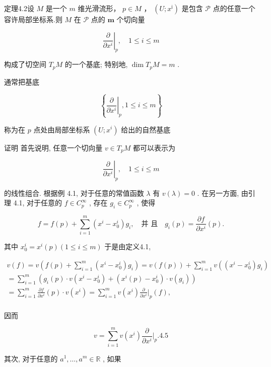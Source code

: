 定理4.2设  $M$  是一个  $m$  维光滑流形，  $p\in M$  ，  $(U;x^{\mathrm{i}})$  是包含  $\mathcal{P}$  点的任意一个容许局部坐标系.则  $M$  在  $\mathcal{P}$  点的  $\pmb{m}$  个切向量

$$
\left. \frac {\partial}{\partial x ^ {i}} \right| _ {p}, \quad 1 \leqslant i \leqslant m
$$

构成了切空间  $T_{p}M$  的一个基底; 特别地,  $\dim T_{p}M = m$ .

通常把基底

$$
\left\{\left. \frac {\partial}{\partial x ^ {i}} \right| _ {p}, 1 \leqslant i \leqslant m \right\}
$$

称为在  $p$  点处由局部坐标系  $(U; x^i)$  给出的自然基底

证明 首先说明, 任意一个切向量  $v \in T_pM$  都可以表示为

$$
\left. \frac {\partial}{\partial x ^ {i}} \right| _ {p}, \quad 1 \leqslant i \leqslant m
$$

的线性组合. 根据例 4.1, 对于任意的常值函数  $\lambda$  有  $v(\lambda) = 0$ . 在另一方面, 由引理 4.1, 对于任意的  $f \in C_{p}^{\infty}$ , 存在  $g_{i} \in C_{p}^{\infty}$ , 使得

$$
f = f (p) + \sum_ {i = 1} ^ {m} (x ^ {i} - x _ {0} ^ {i}) g _ {i}, \quad \text {并 且} \quad g _ {i} (p) = {\frac {\partial f}{\partial x ^ {i}}} (p).
$$

其中  $x_0^i = x^i (p)(1\leqslant i\leqslant m)$  于是由定义4.1,

$$
\begin{array}{l} v (f) = v \left(f (p) + \sum_ {i = 1} ^ {m} \left(x ^ {i} - x _ {0} ^ {i}\right) g _ {i}\right) = v (f (p)) + \sum_ {i = 1} ^ {m} v \left(\left(x ^ {i} - x _ {0} ^ {i}\right) g _ {i}\right) \\ = \sum_ {i = 1} ^ {m} \left(g _ {i} (p) \cdot v \left(x ^ {i} - x _ {0} ^ {i}\right) + \left(x ^ {i} (p) - x _ {0} ^ {i}\right) \cdot v \left(g _ {i}\right)\right) \\ = \sum_ {i = 1} ^ {m} \frac {\partial f}{\partial x ^ {i}} (p) \cdot v \left(x ^ {i}\right) = \sum_ {i = 1} ^ {m} v \left(x ^ {i}\right) \frac {\partial}{\partial x ^ {i}} \Bigg | _ {p} (f), \\ \end{array}
$$

因而

$$
v = \sum_ {i = 1} ^ {m} v \left(x ^ {i}\right) \frac {\partial}{\partial x ^ {i}} \Bigg | _ {p}. %
 {4.5}
$$

其次, 对于任意的  $a^1, \dots, a^m \in \mathbb{R}$ , 如果

